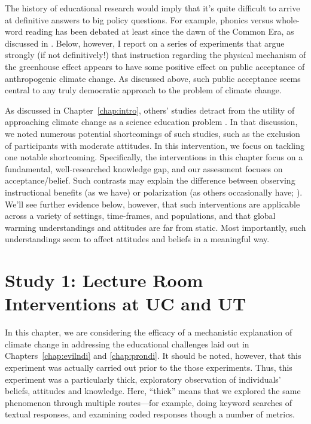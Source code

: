 The history of educational research would imply that it’s quite difficult to
arrive at definitive answers to big policy questions. For example, phonics
versus
whole-word reading has been debated at least since the dawn of the Common Era,
as discussed in \textcite{compayre_history_1889}. Below, however, I report
on a series of experiments that argue strongly (if not definitively!) that
instruction regarding the physical mechanism of the greenhouse effect appears to
have some positive effect on public acceptance of anthropogenic climate change.
As discussed above, such public acceptance seems central to any truly democratic
approach to the problem of climate change.

As discussed in Chapter~\ref{chap:intro}, others’ studies detract from the
utility of approaching climate change as a science education problem
\parencite[e.g.,]{lord_biased_1979,kahan_polarizing_2012}. In that discussion,
we noted numerous potential shortcomings of such studies, such as the exclusion
of participants with moderate attitudes. In this intervention, we focus on
tackling one notable shortcoming. Specifically, the interventions in this chapter 
focus on a fundamental, well-researched knowledge gap, and our assessment
focuses on acceptance/belief.  Such contrasts may explain the difference between
observing instructional benefits (as we have) or polarization (as others
occasionally have; \cite[cf.]{lundmark_new_2007}).  We'll see further evidence
below, however, that such interventions are applicable across a variety of
settings, time-frames, and populations, and that global warming understandings
and attitudes are far from static. Most importantly, such understandings seem to
affect attitudes and beliefs in a meaningful way.


\section{Study 1: Lecture Room Interventions at UC and UT}
\label{sec:mech-classroom}

In this chapter, we are considering the efficacy of a mechanistic explanation of
climate change in addressing the educational challenges laid out in
Chapters~\ref{chap:evilndi} and \ref{chap:prondi}. It should be noted, however,
that this experiment was actually carried out prior to the those experiments.
Thus, this experiment was a particularly thick, exploratory observation of
individuals' beliefs, attitudes and knowledge. Here, “thick” means that we
explored the same phenomenon through multiple routes---for example, doing keyword
searches of textual responses, and examining coded responses though a number of
metrics. 

